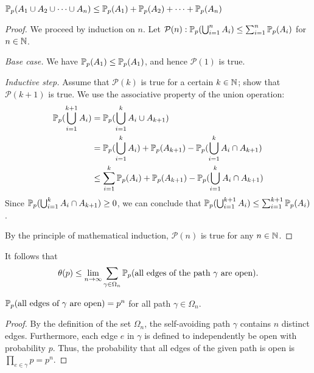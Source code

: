 \documentclass[a4paper, 12pt]{article}
\begin{document}
\begin{lem}\label{lem:union_bound}
$\mathbb{P}_p(A_1 \cup A_2 \cup \cdots \cup A_n) \leq \mathbb{P}_p(A_1) + \mathbb{P}_p(A_2) + \cdots + \mathbb{P}_p(A_n)$
\end{lem}
\begin{proof}[Proof]
We proceed by induction on $n$. Let $\mathcal{P}(n): \mathbb{P}_p(\bigcup_{i = 1}^n A_i) \leq \sum_{i = 1}^n \mathbb{P}_p(A_i)$ for  $n \in \mathbb{N}$.
\begin{description}
\item \textit{Base case.} We have $\mathbb{P}_p(A_1) \leq \mathbb{P}_p(A_1)$, and hence $\mathcal{P}(1)$ is true.
\item \textit{Inductive step.} Assume that $\mathcal{P}(k)$ is true for a certain $k \in \mathbb{N}$; show that $\mathcal{P}(k + 1)$ is true.
We use the associative property of the union operation:
\begin{align*}
    \mathbb{P}_p(\bigcup_{i = 1}^{k + 1} A_i) 
    &= \mathbb{P}_p(\bigcup_{i = 1}^{k} A_i \cup A_{k + 1})\\
    &= \mathbb{P}_p(\bigcup_{i = 1}^{k} A_i) + \mathbb{P}_p(A_{k + 1}) - \mathbb{P}_p(\bigcup_{i = 1}^{k} A_i \cap A_{k + 1})\\
    &\leq \sum_{i = 1}^k \mathbb{P}_p(A_i) + \mathbb{P}_p(A_{k + 1}) - \mathbb{P}_p(\bigcup_{i = 1}^{k} A_i \cap A_{k + 1})\\
\end{align*}
Since $\mathbb{P}_p(\bigcup_{i = 1}^{k} A_i \cap A_{k + 1}) \geq 0$, we can conclude that $\mathbb{P}_p(\bigcup_{i = 1}^{k + 1} A_i) \leq \sum_{i = 1}^{k + 1} \mathbb{P}_p(A_i)$.
\end{description}
By the principle of mathematical induction, $\mathcal{P}(n)$ is true for any $n \in \mathbb{N}$.
\end{proof}

It follows that
\[\theta(p) \leq \lim_{n \to \infty} \sum_{\gamma \in \Omega_n} \mathbb{P}_p(\text{all edges of the path } \gamma \text{ are open}).\]

\begin{prop}\label{prop:p_path_all_open}
$\mathbb{P}_p(\text{all edges of } \gamma \text{ are open}) = p^n$ for all path $\gamma \in \Omega_n$.
\end{prop}
\begin{proof}
By the definition of the set $\Omega_n$, the self-avoiding path $\gamma$ contains $n$ distinct edges. Furthermore, each edge $e$ in $\gamma$ is defined to independently be open with probability $p$. Thus, the probability that all edges of the given path is open is $\prod_{e \in \gamma} p = p^n$.
\end{proof}
\end{document}
